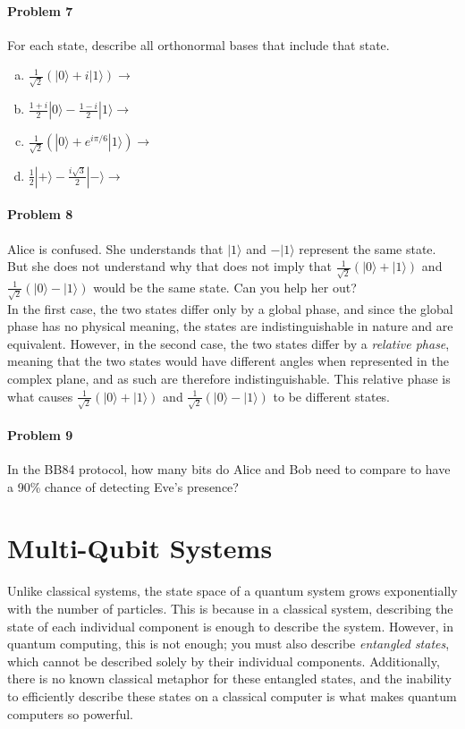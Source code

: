 \documentclass[12pt]{article}
\theoremstyle{mytheor}
\begin{document}
\paragraph{Problem 7} For each state, describe all orthonormal bases that include that state.
\begin{enumerate}[a)] %
\item $\frac{1}{\sqrt{2}}(|0\rangle + i|1\rangle) \rightarrow$
\item $\frac{1+i}{2}|0\rangle - \frac{1-i}{2}|1\rangle \rightarrow$
\item $\frac{1}{\sqrt{2}}(|0\rangle + e^{i\pi/6}|1\rangle) \rightarrow$
\item $\frac{1}{2}|+\rangle - \frac{i\sqrt{3}}{2}|-\rangle \rightarrow$
\end{enumerate}

\paragraph{Problem 8} Alice is confused. She understands that $|1\rangle$ and $-|1\rangle$ represent the same state. But she does not understand why that does not imply that $\frac{1}{\sqrt{2}}(|0\rangle + |1\rangle)$ and $\frac{1}{\sqrt{2}}(|0\rangle - |1\rangle)$ would be the same state. Can you help her out?\\
In the first case, the two states differ only by a global phase, and since the global phase has no physical meaning, the states are indistinguishable in nature and are equivalent. However, in the second case, the two states differ by a \textit{relative phase}, meaning that the two states would have different angles when represented in the complex plane, and as such are therefore indistinguishable. This relative phase is what causes $\frac{1}{\sqrt{2}}(|0\rangle + |1\rangle)$ and $\frac{1}{\sqrt{2}}(|0\rangle - |1\rangle)$ to be different states.

\paragraph{Problem 9} In the BB84 protocol, how many bits do Alice and Bob need to compare to have a 90\% chance of detecting Eve's presence?

\section{Multi-Qubit Systems}

Unlike classical systems, the state space of a quantum system grows exponentially with the number of particles. This is because in a classical system, describing the state of each individual component is enough to describe the system. However, in quantum computing, this is not enough; you must also describe \textit{entangled states}, which cannot be described solely by their individual components. Additionally, there is no known classical metaphor for these entangled states, and the inability to efficiently describe these states on a classical computer is what makes quantum computers so powerful.
\end{document}
